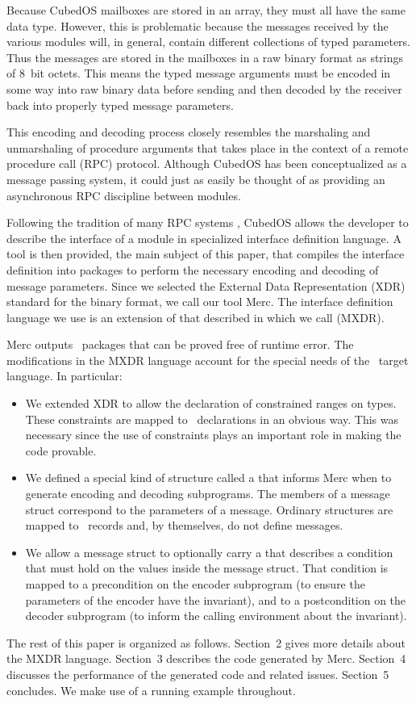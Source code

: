 Because CubedOS mailboxes are stored in an array, they must all have the same data type.
However, this is problematic because the messages received by the various modules will, in
general, contain different collections of typed parameters. Thus the messages are stored in the
mailboxes in a raw binary format as strings of 8~bit octets.  This means the typed message
arguments must be encoded in some way into raw binary data before sending and then decoded by
the receiver back into properly typed message parameters.

This encoding and decoding process closely resembles the marshaling and unmarshaling of
procedure arguments that takes place in the context of a remote procedure call (RPC) protocol.
Although CubedOS has been conceptualized as a message passing system, it could just as easily be
thought of as providing an asynchronous RPC discipline between modules.

Following the tradition of many RPC systems , CubedOS allows the
developer to describe the interface of a module in specialized interface definition language. A
tool is then provided, the main subject of this paper, that compiles the interface definition
into packages to perform the necessary encoding and decoding of message parameters. Since we
selected the External Data Representation (XDR) standard \cite{rfc-4506} for the binary format,
we call our tool Merc. The interface definition language we use is an extension of that
described in  which we call  (MXDR).

Merc outputs \SPARK\ packages that can be proved free of runtime error. The modifications in
the MXDR language account for the special needs of the \SPARK\ target language. In particular:

\begin{itemize}
\item We extended XDR to allow the declaration of constrained ranges on types. These constraints
  are mapped to \SPARK\ declarations in an obvious way. This was necessary since the use of
  constraints plays an important role in making the code provable.

\item We defined a special kind of structure called a  that informs
  Merc when to generate encoding and decoding subprograms. The members of a message struct
  correspond to the parameters of a message. Ordinary structures are mapped to \SPARK\ records
  and, by themselves, do not define messages.

\item We allow a message struct to optionally carry a  that describes
  a condition that must hold on the values inside the message struct. That condition is mapped
  to a precondition on the encoder subprogram (to ensure the parameters of the encoder have the
  invariant), and to a postcondition on the decoder subprogram (to inform the calling
  environment about the invariant).
\end{itemize}

The rest of this paper is organized as follows. Section~2 gives more details about the MXDR
language. Section~3 describes the code generated by Merc. Section~4 discusses the performance
of the generated code and related issues. Section~5 concludes. We make use of a running example
throughout.
